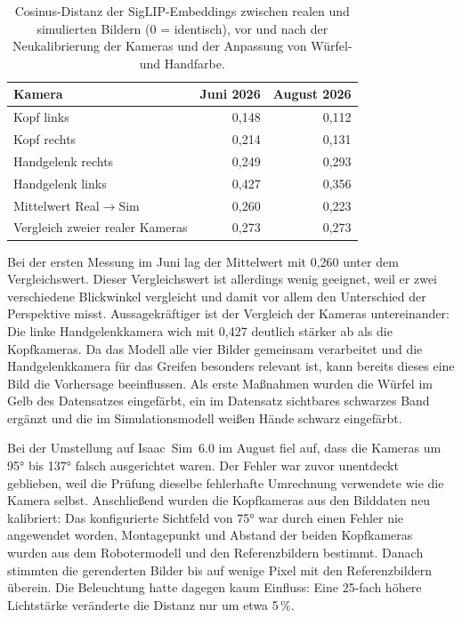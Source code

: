 \begin{table}[htb]
  \centering
  \begin{tabular}{lrr}
    \toprule
    Kamera & Juni 2026 & August 2026 \\
    \midrule
    Kopf links              & 0,148 & 0,112 \\
    Kopf rechts             & 0,214 & 0,131 \\
    Handgelenk rechts       & 0,249 & 0,293 \\
    Handgelenk links        & 0,427 & 0,356 \\
    \midrule
    Mittelwert Real$\to$Sim & 0,260 & 0,223 \\
    Vergleich zweier realer Kameras & 0,273 & 0,273 \\
    \bottomrule
  \end{tabular}
  \caption{Cosinus-Distanz der SigLIP-Embeddings zwischen realen und
    simulierten Bildern (0 = identisch), vor und nach der Neukalibrierung der
    Kameras und der Anpassung von Würfel- und Handfarbe.}
  \label{tab:domain-gap}
\end{table}

Bei der ersten Messung im Juni lag der Mittelwert mit 0,260 unter dem
Vergleichswert. Dieser Vergleichswert ist allerdings wenig geeignet, weil er
zwei verschiedene Blickwinkel vergleicht und damit vor allem den Unterschied
der Perspektive misst. Aussagekräftiger ist der Vergleich der Kameras
untereinander: Die linke Handgelenkkamera wich mit 0,427 deutlich stärker ab
als die Kopfkameras. Da das Modell alle vier Bilder gemeinsam verarbeitet und
die Handgelenkkamera für das Greifen besonders relevant ist, kann bereits
dieses eine Bild die Vorhersage beeinflussen. Als erste Maßnahmen wurden die
Würfel im Gelb des Datensatzes eingefärbt, ein im Datensatz sichtbares
schwarzes Band ergänzt und die im Simulationsmodell weißen Hände schwarz
eingefärbt.

Bei der Umstellung auf Isaac~Sim~6.0 im August fiel auf, dass die Kameras um
95° bis 137° falsch ausgerichtet waren. Der Fehler war zuvor unentdeckt
geblieben, weil die Prüfung dieselbe fehlerhafte Umrechnung verwendete wie die
Kamera selbst. Anschließend wurden die Kopfkameras aus den Bilddaten neu
kalibriert: Das konfigurierte Sichtfeld von 75° war durch einen Fehler nie
angewendet worden, Montagepunkt und Abstand der beiden Kopfkameras wurden aus
dem Robotermodell und den Referenzbildern bestimmt. Danach stimmten die
gerenderten Bilder bis auf wenige Pixel mit den Referenzbildern überein. Die
Beleuchtung hatte dagegen kaum Einfluss: Eine 25-fach höhere Lichtstärke
veränderte die Distanz nur um etwa 5\,\%.

